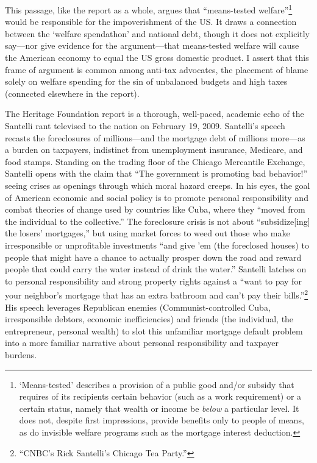 \documentclass[12pt,oneside]{psthesis}
\begin{document}
This passage, like the report as a whole, argues that ``means-tested welfare''\footnote{`Means-tested' describes a provision of a public good and/or subsidy that requires of its recipients certain behavior (such as a work requirement) or a certain status, namely that wealth or income be \emph{below} a particular level. It does not, despite first impressions, provide benefits only to people of means, as do invisible welfare programs such as the mortgage interest deduction.} would be responsible for the impoverishment of the US.
It draws a connection between the `welfare spendathon' and national debt, though it does not explicitly say---nor give evidence for the argument---that means-tested welfare will cause the American economy to equal the US gross domestic product.
I assert that this frame of argument is common among anti-tax advocates, the placement of blame solely on welfare spending for the sin of unbalanced budgets and high taxes (connected elsewhere in the report).

The Heritage Foundation report is a thorough, well-paced, academic echo of the Santelli rant televised to the nation on February 19, 2009.
Santelli's speech recasts the foreclosures of millions---and the mortgage debt of millions more---as a burden on taxpayers, indistinct from unemployment insurance, Medicare, and food stamps.
Standing on the trading floor of the Chicago Mercantile Exchange, Santelli opens with the claim that ``The government is promoting bad behavior!'' seeing crises as openings through which moral hazard creeps.
In his eyes, the goal of American economic and social policy is to promote personal responsibility and combat theories of change used by countries like Cuba, where they ``moved from the individual to the collective.''
The foreclosure crisis is not about ``subsidize{[}ing{]} the losers' mortgages,'' but using market forces to weed out those who make irresponsible or unprofitable investments ``and give 'em (the foreclosed houses) to people that might have a chance to actually prosper down the road and reward people that could carry the water instead of drink the water.''
Santelli latches on to personal responsibility and strong property rights against a ``want to pay for your neighbor's mortgage that has an extra bathroom and can't pay their bills.''\footnote{``CNBC's Rick Santelli's Chicago Tea Party.''}
His speech leverages Republican enemies (Communist-controlled Cuba, irresponsible debtors, economic inefficiencies) and friends (the individual, the entrepreneur, personal wealth) to slot this unfamiliar mortgage default problem into a more familiar narrative about personal responsibility and taxpayer burdens.
\end{document}
